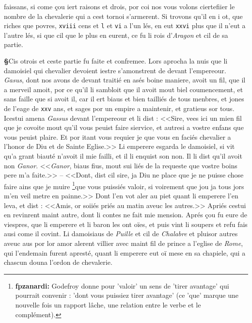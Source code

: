 \documentclass[12pt]{article} %
\newcommand{\persName}[1]{\emph{#1}} %
\newcommand{\placeName}[1]{\emph{#1}} %
\newcommand{\num}[1]{\texttt{#1}}    %
\newcommand{\supplied}[1]{\textlangle#1\textrangle} %
\newcommand{\fnfpz}[1]{\footnote{\textbf{fpzanardi:} #1}} %
\newcounter{paranum}
\newcommand{\pnum}{\stepcounter{paranum}\textbf{§\arabic{paranum}}\quad}
\begin{document}
faissans, si come çou iert raisons et drois, por coi nos vous volons ciertefiier le nombre de la chevalerie qui a cest tornoi s'armerent. Si t\supplied{r}ovons qu'il en i ot, que riches que povres, \num{xviii} cens et \num{l} et \num{vi} a l'un lés, en eut \num{xxvi} plus que il n'eut a l'autre lés, si que cil que le plus en eurent, ce fu li rois d'\placeName{Aragon} et cil de sa partie.


\pnum Cis otrois et ceste partie fu faite et confremee. Lors aprocha la nuis que li damoisiel qui chevalier devoient iestre s'amonstrent de devant l'empereour. \persName{Gasus}, dont nos avons de devant traitié en asés boine maniere, avoit un fil, que il a merveil amoit, por ce qu'il li sambloit que il avoit mout biel coumencement, et sans faille que si avoit il, car il ert biaus et bien tailliés de tous menbres, et jones de l'eage de \num{xxv} ans, et sages por un empire a maintenir, et gratieus sor tous. Icestui amena \persName{Gassus} devant l'empereour et li dist : <<Sire, vees ici un mien fil que je covoite mout qu'il vous peuist faire siervice, et autresi a vostre enfans que vous peuist plaire. Et por itant vous requier je que vous en faciés chevalier a l'honor de Diu et de Sainte Eglise.>> Li emperere esgarda le damoisiel, si vit q\supplied{u}'a grant biauté n'avoit il mie failli, et il li enquist son non. Il li dist qu'il avoit non \persName{Ganor}. <<\persName{Ganor}, biaus fius, mout sui liés de la requeste que vostre boins pere m'a faite.>> -- <<Dont, dist cil sire, ja Diu ne place que je ne puisse chose faire ains que je muire \fnfpz{Godefroy donne pour 'valoir' un sens de 'tirer avantage' qui pourrait convenir : 'dont vous puissiez tirer avantage' (ce 'que' marque une nouvelle fois un rapport lâche, une relation entre le verbe et le complément).}que vous puissiés valoir, si voireme\supplied{n}t que jou ja tous jors m'en veil metre en painne.>> Dont l'en vot aler au piet quant li emperere l'en leva, et dist : <<Amis, or soiiés priés au matin aveuc les autres.>> Apriés cestui en revinrent maint autre, dont li contes ne fait mie mension. Aprés çou fu eure de viespres, que li emperere et li baron les ont oïes, et puis vint li soupers et refu fais ausi come il covint. Li damoisiaus de \placeName{Puille} et cil de \placeName{Chalabre} et pluisor autres aveuc aus por lor amor alerent villier avec maint fil de prince a l'eglise de \placeName{Rome}, qui l'endemain furent apresté, quant li emperere eut oï mese en sa chapiele, qui a chascun douna l'ordon de chevalerie.
\end{document}
